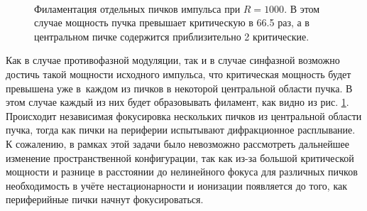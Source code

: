 
\begin{figure}[H]
    \begin{center}
        \begin{minipage}{\minipagewidththree}
        \end{minipage}
        \hfill
        \begin{minipage}{\minipagewidththree}
        \end{minipage}
        \hfill
        \begin{minipage}{\minipagewidththree}
        \end{minipage}
        \\[1ex]
        \caption{Филаментация отдельных пичков импульса при $R = 1000$. В этом случае мощность пучка превышает критическую в 66.5 раз,
                 а в центральном пичке содержится приблизительно 2 критические.}
        \label{fig:BeamsR1000}
    \end{center}
\end{figure}


Как в случае противофазной модуляции, так и в случае синфазной возможно достичь такой
мощности исходного импульса, что критическая мощность будет превышена уже в~каждом из пичков в некоторой центральной области пучка.
В этом случае каждый из них будет образовывать филамент, как видно из рис. \ref{fig:BeamsR1000}.
Происходит независимая фокусировка нескольких пичков из центральной области пучка, тогда как пички на периферии испытывают дифракционное расплывание.
К сожалению, в рамках этой задачи было невозможно рассмотреть дальнейшее изменение пространственной конфигурации, так как из-за большой критической мощности
и разнице в расстоянии до нелинейного фокуса для различных пичков необходимость в учёте нестационарности и ионизации появляется до того, как периферийные пички начнут фокусироваться.


